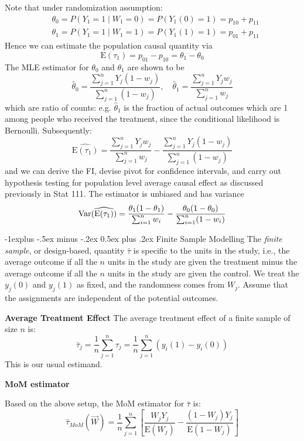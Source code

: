 \documentclass[10pt,landscape]{article}
\makeatletter
\renewcommand{\subsection}{\@startsection{subsection}{2}{0mm}%
                                {-1explus -.5ex minus -.2ex}%
                                {0.5ex plus .2ex}%
                                {\normalfont\normalsize\bfseries}}
\newcommand{\E}{\text{E}}
\makeatother
\begin{document}
\begin{multicols*}{3}
Note that under randomization assumption:
$$
\begin{aligned}
& \theta_0=P\left(Y_1=1 \mid W_1=0\right)=P\left(Y_1(0)=1\right)=p_{10}+p_{11} \\
& \theta_1=P\left(Y_1=1 \mid W_1=1\right)=P\left(Y_1(1)=1\right)=p_{01}+p_{11}
\end{aligned}
$$
Hence we can estimate the population causal quantity via
$$
\E\left(\tau_1\right)=p_{01}-p_{10}=\theta_1-\theta_0
$$
The MLE estimator for $\theta_0$ and $\theta_1$ are shown to be
$$
\hat{\theta}_0=\frac{\sum_{j=1}^n Y_j\left(1-w_j\right)}{\sum_{j=1}^n\left(1-w_j\right)}, \quad \hat{\theta}_1=\frac{\sum_{j=1}^n Y_j w_j}{\sum_{j=1}^n w_j}
$$
which are ratio of counts: e.g. $\hat{\theta}_1$ is the fraction of actual outcomes which are 1 among people who received the treatment, since the conditional likelihood is Bernoulli. Subsequently:
$$
\widehat{\E\left(\tau_1\right)}=\frac{\sum_{j=1}^n Y_j w_j}{\sum_{j=1}^n w_j}-\frac{\sum_{j=1}^n Y_j\left(1-w_j\right)}{\sum_{j=1}^n\left(1-w_j\right)}
$$
and we can derive the FI, devise pivot for confidence intervals, and carry out hypothesis testing for population level average causal effect as discussed previously in Stat 111. The estimator is unbiased and has variance
$$
\Var(\widehat{\E(\tau_1)})=\frac{\theta_1(1-\theta_1)}{\sum_{i=1}^nw_i}-\frac{\theta_0(1-\theta_0)}{\sum_{i=1}^n(1-w_i)}
$$

\subsection{Finite Sample Modelling}
The \textit{finite sample}, or design-based, quantity $\bar{\tau}$ is specific to the units in the study, i.e., the average outcome if all the $n$ units in the study are given the treatment minus the average outcome if all the $n$ units in the study are given the control. We treat the $y_j(0)$ and $y_j(1)$ as fixed, and the randomness comes from $W_j$. Assume that the assignments are independent of the potential outcomes.


\textbf{Average Treatment Effect}
The average treatment effect of a finite sample of size $n$ is:
    $$\bar{\tau}_j=\frac{1}{n}\sum_{j=1}^n \tau_j = \frac{1}{n} \sum_{j=1}^n (y_i(1)-y_i(0))$$
This is our usual estimand.

\textbf{MoM estimator}

Based on the above setup, the MoM estimator for $\bar{\tau}$ is:$$\hat{\tau}_{MoM} (\vec W) = \frac{1}{n} \sum_{j=1}^n \left[\frac{W_jY_j}{\E(W_j)} - \frac{(1-W_j)Y_j}{\E(1-W_j)} \right]$$


\end{multicols*}
\end{document}
